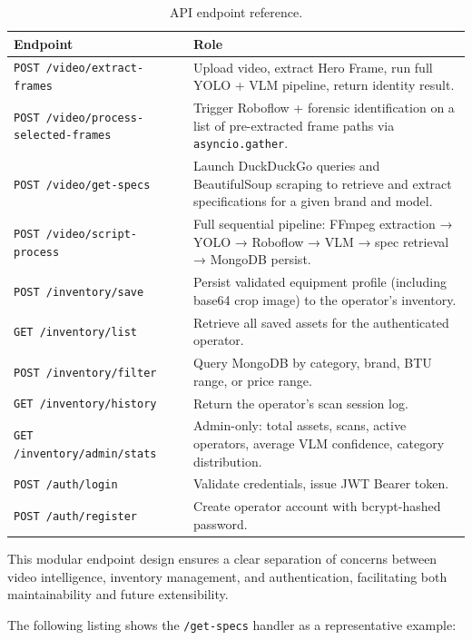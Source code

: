 \begin{table}[htbp]
\centering
\caption{API endpoint reference.}
\label{tab:ch4-endpoints}
\begin{tabular}{p{5.5cm} p{8.5cm}}
\toprule
\textbf{Endpoint} & \textbf{Role} \\
\midrule
\texttt{POST /video/extract-frames}         & Upload video, extract Hero Frame, run full YOLO + VLM pipeline, return identity result. \\
\texttt{POST /video/process-selected-frames}& Trigger Roboflow + forensic identification on a list of pre-extracted frame paths via \texttt{asyncio.gather}. \\
\texttt{POST /video/get-specs}              & Launch DuckDuckGo queries and BeautifulSoup scraping to retrieve and extract specifications for a given brand and model. \\
\texttt{POST /video/script-process}         & Full sequential pipeline: FFmpeg extraction → YOLO → Roboflow → VLM → spec retrieval → MongoDB persist. \\
\midrule
\texttt{POST /inventory/save}               & Persist validated equipment profile (including base64 crop image) to the operator's inventory. \\
\texttt{GET  /inventory/list}               & Retrieve all saved assets for the authenticated operator. \\
\texttt{POST /inventory/filter}             & Query MongoDB by category, brand, BTU range, or price range. \\
\texttt{GET  /inventory/history}            & Return the operator's scan session log. \\
\texttt{GET  /inventory/admin/stats}        & Admin-only: total assets, scans, active operators, average VLM confidence, category distribution. \\
\midrule
\texttt{POST /auth/login}                   & Validate credentials, issue JWT Bearer token. \\
\texttt{POST /auth/register}                & Create operator account with bcrypt-hashed password. \\
\bottomrule
\end{tabular}
\end{table}

This modular endpoint design ensures a clear separation of concerns between video intelligence, inventory management, and authentication, facilitating both maintainability and future extensibility.

The following listing shows the \texttt{/get-specs} handler as a representative example:

